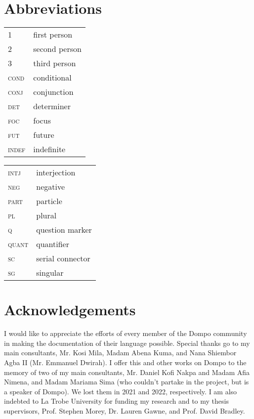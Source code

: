 \documentclass[output=paper,colorlinks,citecolor=brown]{langscibook}
\begin{document}
\section*{Abbreviations}
\begin{tabularx}{.5\textwidth}[t]{@{}lQ}
1 & first person \\
2  & second person \\
3 & third person \\
 \textsc{cond} & conditional \\
 \textsc{conj} & conjunction \\
 \textsc{det} & determiner \\
 \textsc{foc} & focus \\
 \textsc{fut} & future \\
\textsc{indef} & indefinite \\
\end{tabularx}%
\begin{tabularx}{.5\textwidth}[t]{lQ@{}}
\textsc{intj} & interjection \\
\textsc{neg} & negative \\
\textsc{part} & particle \\
\textsc{pl} & plural \\
\textsc{q} & question marker \\
\textsc{quant} & quantifier \\
\textsc{sc} & serial connector \\
\textsc{sg} & singular \\
\end{tabularx}


\section*{Acknowledgements}
I would like to appreciate the efforts of every member of the Dompo community in making the documentation of their language possible. Special thanks go to my main consultants, Mr. Kosi Mila, Madam Abena Kuma, and Nana Shiembor Agba II (Mr. Emmanuel Dwirah). I offer this and other works on Dompo to the memory of two of my main consultants, Mr. Daniel Kofi Nakpa and Madam Afia Nimena, and Madam Mariama Sima (who couldn't partake in the project, but is a speaker of Dompo). We lost them in 2021 and 2022, respectively. I am also indebted to La Trobe University for funding my research and to my thesis supervisors, Prof. Stephen Morey, Dr. Lauren Gawne, and Prof. David Bradley.


{\sloppy\printbibliography[heading=subbibliography,notkeyword=this]}
\end{document}
